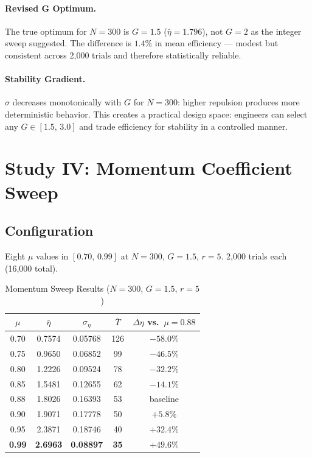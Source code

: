 \documentclass[journal,compsoc]{IEEEtran}
\begin{document}
\paragraph{Revised G Optimum.}
The true optimum for $N=300$ is $G=1.5$ ($\bar{\eta}=1.796$), not $G=2$ as the
integer sweep suggested. The difference is $1.4\%$ in mean efficiency --- modest but
consistent across 2{,}000 trials and therefore statistically reliable.

\paragraph{Stability Gradient.}
$\sigma$ decreases monotonically with $G$ for $N=300$: higher repulsion produces more
deterministic behavior. This creates a practical design space: engineers can select
any $G \in [1.5,\,3.0]$ and trade efficiency for stability in a controlled manner.

\section{Study IV: Momentum Coefficient Sweep}
\label{sec:musweep}

\subsection{Configuration}
Eight $\mu$ values in $[0.70,\,0.99]$ at $N=300$, $G=1.5$, $r=5$.
2{,}000 trials each (16{,}000 total).

\begin{table}[H]
\renewcommand{\arraystretch}{1.3}
\caption{Momentum Sweep Results ($N=300$, $G=1.5$, $r=5$)}
\label{tab:musweep}
\centering
\begin{tabular}{ccccc}
\hline
$\mu$ & $\bar{\eta}$ & $\sigma_\eta$ & $\bar{T}$ & $\Delta\eta$ vs.\ $\mu{=}0.88$ \\
\hline
0.70 & 0.7574 & 0.05768 & 126 & $-58.0\%$ \\
0.75 & 0.9650 & 0.06852 &  99 & $-46.5\%$ \\
0.80 & 1.2226 & 0.09524 &  78 & $-32.2\%$ \\
0.85 & 1.5481 & 0.12655 &  62 & $-14.1\%$ \\
0.88 & 1.8026 & 0.16393 &  53 & baseline \\
0.90 & 1.9071 & 0.17778 &  50 & $+5.8\%$ \\
0.95 & 2.3871 & 0.18746 &  40 & $+32.4\%$ \\
\textbf{0.99} & \textbf{2.6963} & \textbf{0.08897} & \textbf{35} & $\mathbf{+49.6\%}$ \\
\hline
\end{tabular}
\end{table}
\end{document}
